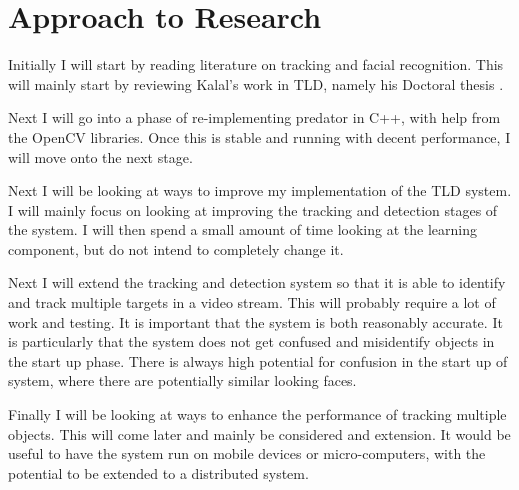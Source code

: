 \section{Approach to Research}
  Initially I will start by reading literature on tracking and facial recognition.
  This will mainly start by reviewing Kalal's work in TLD, namely his Doctoral thesis \cite{KalalPHD}.

  Next I will go into a phase of re-implementing predator in C++, with help from the OpenCV libraries.
  Once this is stable and running with decent performance, I will move onto the next stage.

  Next I will be looking at ways to improve my implementation of the TLD system.
  I will mainly focus on looking at improving the tracking and detection stages of the system.
  I will then spend a small amount of time looking at the learning component, but do not intend to completely change it.

  Next I will extend the tracking and detection system so that it is able to identify and track multiple targets in a video stream.
  This will probably require a lot of work and testing.
  It is important that the system is both reasonably accurate.
  It is particularly that the system does not get confused and misidentify objects in the start up phase.
  There is always high potential for confusion in the start up of system, where there are potentially similar looking faces.

  Finally I will be looking at ways to enhance the performance of tracking multiple objects.
  This will come later and mainly be considered and extension.
  It would be useful to have the system run on mobile devices or micro-computers, with the potential to be extended to a distributed system.
